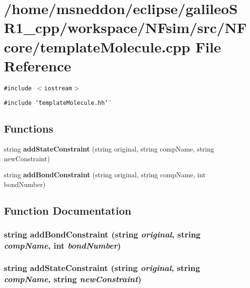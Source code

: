 \section{/home/msneddon/eclipse/galileoSR1\_\-cpp/workspace/NFsim/src/NFcore/templateMolecule.cpp File Reference}
\label{templateMolecule_8cpp}


{\tt \#include $<$iostream$>$}\par
{\tt \#include \char`\"{}templateMolecule.hh\char`\"{}}\par
\subsection*{Functions}
\begin{CompactItemize}
\item 
string {\bf addStateConstraint} (string original, string compName, string newConstraint)
\item 
string {\bf addBondConstraint} (string original, string compName, int bondNumber)
\end{CompactItemize}


\subsection{Function Documentation}
\subsubsection{\setlength{\rightskip}{0pt plus 5cm}string addBondConstraint (string {\em original}, string {\em compName}, int {\em bondNumber})}\label{templateMolecule_8cpp_7cb43d45a2c9b9949241f1351c3ed7b0}


\subsubsection{\setlength{\rightskip}{0pt plus 5cm}string addStateConstraint (string {\em original}, string {\em compName}, string {\em newConstraint})}\label{templateMolecule_8cpp_7c45e3f4b9c8d3d06577f5f30f661857}


